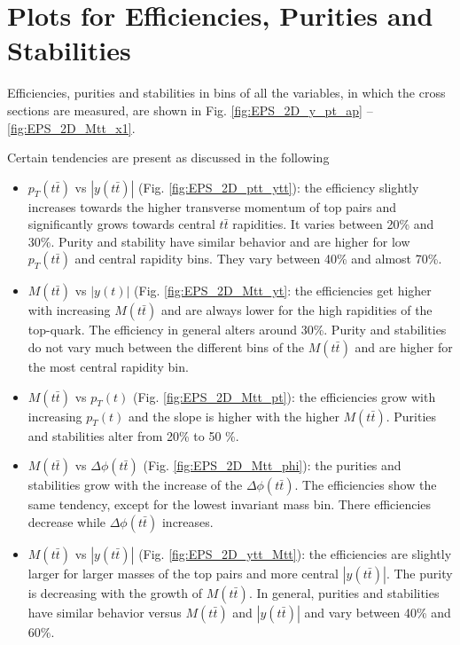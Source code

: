 \chapter{Plots for Efficiencies, Purities and Stabilities}\label{appendix:EPS}

Efficiencies, purities and stabilities in bins of all the variables, in which the cross sections
are measured, are shown in Fig. \ref{fig:EPS_2D_y_pt_ap} -- \ref{fig:EPS_2D_Mtt_x1}.

Certain tendencies are present as discussed in the following 

\begin{itemize}
 \item  $p_{T}(t\bar{t})$ vs $|y(t\bar{t})|$ (Fig. \ref{fig:EPS_2D_ptt_ytt}): the efficiency slightly increases towards the higher transverse momentum of top pairs and significantly 
 grows towards central $t\bar{t}$ rapidities. It varies between 20\% and 30\%. Purity and stability have similar behavior and are higher for low $p_{T}(t\bar{t})$ and 
 central rapidity bins. They vary between 40\% and almost 70\%.
 
 \item $M(t\bar{t})$ vs $|y(t)|$ (Fig. \ref{fig:EPS_2D_Mtt_yt}: the efficiencies get higher with increasing $M(t\bar{t})$ and are always lower for the high rapidities of 
 the top-quark. The efficiency in general alters around 30\%. Purity and stabilities do not vary much between the different bins of the $M(t\bar{t})$ and are higher for the most 
 central rapidity bin.
 
 \item $M(t\bar{t})$ vs $p_{T}(t)$ (Fig. \ref{fig:EPS_2D_Mtt_pt}): the efficiencies grow with increasing $p_{T}(t)$ and the slope is higher with the higher $M(t\bar{t})$. 
 Purities and stabilities alter from 20\% to 50 \%.
 
 \item $M(t\bar{t})$ vs $\Delta\phi(t\bar{t})$ (Fig. \ref{fig:EPS_2D_Mtt_phi}): the purities and stabilities grow with the increase of the $\Delta\phi(t\bar{t})$. The efficiencies 
 show the same tendency, except for the lowest invariant mass bin. There efficiencies decrease while $\Delta\phi(t\bar{t})$ increases.
 
 \item $M(t\bar{t})$ vs $|y(t\bar{t})|$ (Fig. \ref{fig:EPS_2D_ytt_Mtt}): the efficiencies are slightly larger for larger masses of the top pairs and more central 
 $|y(t\bar{t})|$. The purity is decreasing with the growth of $M(t\bar{t})$. In general, purities and stabilities have similar behavior versus $M(t\bar{t})$ and 
 $|y(t\bar{t})|$ and vary between 40\% and 60\%.
 

\end{itemize}
